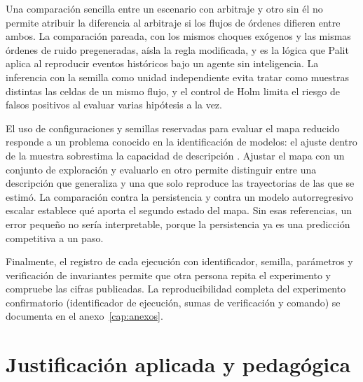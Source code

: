 Una comparación sencilla entre un escenario con arbitraje y otro sin él no permite atribuir la diferencia al arbitraje si los flujos de órdenes difieren entre ambos. La comparación pareada, con los mismos choques exógenos y las mismas órdenes de ruido pregeneradas, aísla la regla modificada, y es la lógica que Palit \cite{palit2022shuffled} aplica al reproducir eventos históricos bajo un agente sin inteligencia. La inferencia con la semilla como unidad independiente evita tratar como muestras distintas las celdas de un mismo flujo, y el control de Holm limita el riesgo de falsos positivos al evaluar varias hipótesis a la vez.

El uso de configuraciones y semillas reservadas para evaluar el mapa reducido responde a un problema conocido en la identificación de modelos: el ajuste dentro de la muestra sobrestima la capacidad de descripción \cite{lamperti2018surrogates}. Ajustar el mapa con un conjunto de exploración y evaluarlo en otro permite distinguir entre una descripción que generaliza y una que solo reproduce las trayectorias de las que se estimó. La comparación contra la persistencia y contra un modelo autorregresivo escalar establece qué aporta el segundo estado del mapa. Sin esas referencias, un error pequeño no sería interpretable, porque la persistencia ya es una predicción competitiva a un paso.

Finalmente, el registro de cada ejecución con identificador, semilla, parámetros y verificación de invariantes \cite{grimm2020odd,railsback2019agent} permite que otra persona repita el experimento y compruebe las cifras publicadas. La reproducibilidad completa del experimento confirmatorio (identificador de ejecución, sumas de verificación y comando) se documenta en el anexo~\ref{cap:anexos}.

\section{Justificación aplicada y pedagógica}

